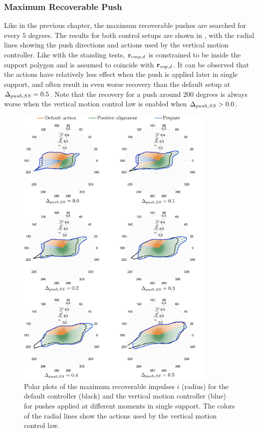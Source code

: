 \subsubsection{Maximum Recoverable Push}
Like in the previous chapter,  the maximum recoverable pushes are searched for every $5$ degrees. The results for both control setups are shown in , with the radial lines showing the push directions and actions used by the vertical motion controller. Like with the standing tests, $\mathbf{r}_{cmp,d}$ is constrained to be inside the support polygon and is assumed to coincide with $\mathbf{r}_{cop,d}$. It can be observed that the actions have relatively less effect when the push is applied later in single support, and often result in even worse recovery than the default setup at $\Delta_{push,SS}=0.5$. Note that the recovery for a push around $200$ degrees is always worse when the vertical motion control law is enabled when $\Delta_{push,SS}>0.0$.
\begin{figure}
     \centering
        \includegraphics[width=0.85\textwidth]{STYLESTUFF/rounActions.png}
    \caption{Polar plots of the maximum recoverable impulses $i$ (radius) for the default controller (black) and the vertical motion controller (blue) for pushes applied at different moments in single support. The colors of the radial lines show the actions used by the vertical motion control law.}
    \label{fig:roundPushActions}
\end{figure}
